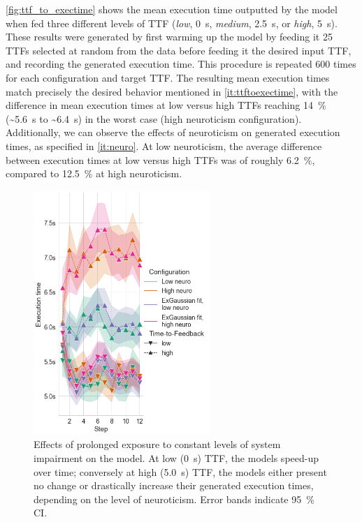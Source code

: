 \cref{fig:ttf_to_exectime} shows the mean execution time outputted by the model when fed three different levels of \gls{TTF} (\emph{low}, \SI{0}{\second}, \emph{medium}, \SI{2.5}{\second}, or \emph{high}, \SI{5}{\second}).
These results were generated by first warming up the model by feeding it \num{25} \glspl{TTF} selected at random from the data before feeding it the desired input \gls{TTF}, and recording the generated execution time.
This procedure is repeated \num{600} times for each configuration and target \gls{TTF}.
The resulting mean execution times match precisely the desired behavior mentioned in \cref{it:ttftoexectime}, with the difference in mean execution times at low versus high \glspl{TTF} reaching \SI{14}{\percent} (\textasciitilde\SI{5.6}{\second} to \textasciitilde\SI{6.4}{\second}) in the worst case (high neuroticism configuration).
Additionally, we can observe the effects of neuroticism on generated execution times, as specified in \cref{it:neuro}.
At low neuroticism, the average difference between execution times at low versus high \glspl{TTF} was of roughly \SI{6.2}{\percent}, compared to \SI{12.5}{\percent} at high neuroticism.

\begin{figure}
    \centering
    \includegraphics[height=25em]{figs/new_model/exectime_over_steps}
    \caption{%
    Effects of prolonged exposure to constant levels of system impairment on the model.
    At low (\SI{0}{\second}) \gls{TTF}, the models speed-up over time; conversely at high (\SI{5.0}{\second}) \gls{TTF}, the models either present no change or drastically increase their generated execution times, depending on the level of neuroticism.
    Error bands indicate \SI{95}{\percent} \gls{CI}.
    }\label{fig:exectimeduration}
\end{figure}

